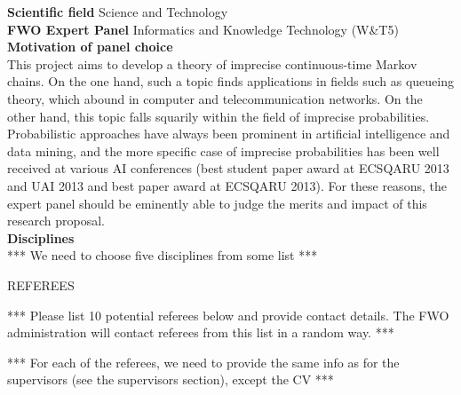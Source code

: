 \documentclass[11pt,dvipsnames,usenames,a4paper]{article}
\begin{document}
{\bf Scientific field} \tab Science and Technology \\
{\bf FWO Expert Panel} \tab Informatics and Knowledge Technology (W\&T5) \\[8pt]
{\bf Motivation of panel choice}\\[6pt]
This project aims to develop a theory of imprecise continuous-time Markov chains. On the one hand, such a topic finds applications in fields such as queueing theory, which abound in computer and telecommunication networks. On the other hand, this topic falls squarily within the field of imprecise probabilities. Probabilistic approaches have always been prominent in artificial intelligence and data mining, and the more specific case of imprecise probabilities has been well received at various AI conferences (best student paper award at ECSQARU 2013 and UAI 2013 and best paper award at ECSQARU 2013). For these reasons, the expert panel should be eminently able to judge the merits and impact of this research proposal.\\[8pt]
{\bf Disciplines}\\[6pt]
*** We need to choose five disciplines from some list ***


\vspace{5mm}

\begin{shaded}\centering REFEREES \end{shaded}


*** Please list 10 potential referees below and provide contact details.
The FWO administration will contact referees from this list in a random way. ***

*** For each of the referees, we need to provide the same info as for the supervisors (see the supervisors section), except the CV ***
\end{document}
